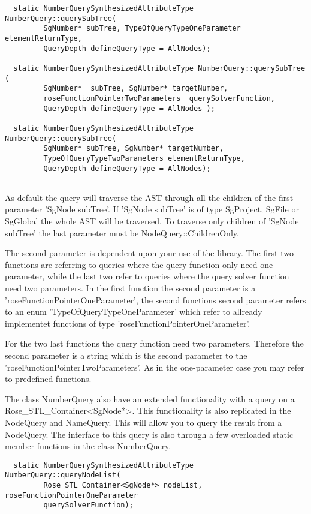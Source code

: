 {\begin{verbatim}
  static NumberQuerySynthesizedAttributeType NumberQuery::querySubTree( 
         SgNumber* subTree, TypeOfQueryTypeOneParameter elementReturnType,
         QueryDepth defineQueryType = AllNodes);
	 	
  static NumberQuerySynthesizedAttributeType NumberQuery::querySubTree (
         SgNumber*  subTree, SgNumber* targetNumber,
         roseFunctionPointerTwoParameters  querySolverFunction,
         QueryDepth defineQueryType = AllNodes );
	  
  static NumberQuerySynthesizedAttributeType NumberQuery::querySubTree( 
         SgNumber* subTree, SgNumber* targetNumber, 
         TypeOfQueryTypeTwoParameters elementReturnType,
         QueryDepth defineQueryType = AllNodes);
	  
\end{verbatim}  

As default the query will traverse the AST through all the children of the
first parameter 'SgNode subTree'. If 'SgNode subTree' is of type SgProject, 
SgFile or SgGlobal the whole AST will be traversed. To traverse only children
of 'SgNode subTree' the last parameter must be NodeQuery::ChildrenOnly. 

The second parameter is dependent upon your use of the library. The
first two functions are referring to queries where the query function
only need one parameter, while the last two refer to queries where the 
query solver function need two parameters. In the first function the second
parameter is a 'roseFunctionPointerOneParameter', the second functions
second parameter refers to an enum 'TypeOfQueryTypeOneParameter' which 
refer to allready implementet functions of type 
'roseFunctionPointerOneParameter'. 

For the two last functions the query function need two
parameters. Therefore the second parameter is a string which is the
second parameter to the 'roseFunctionPointerTwoParameters'. As in the
one-parameter case you may refer to predefined functions.

The class NumberQuery also have an extended functionality with a query
on a Rose\_STL\_Container<SgNode*>. This functionality is also replicated in the
NodeQuery and NameQuery. This will allow you to query the result
from a NodeQuery. The interface to this query is also through a few
overloaded static member-functions in the class NumberQuery.
\begin{verbatim}
  static NumberQuerySynthesizedAttributeType NumberQuery::queryNodeList(
         Rose_STL_Container<SgNode*> nodeList, roseFunctionPointerOneParameter
         querySolverFunction);


\end{verbatim}}
